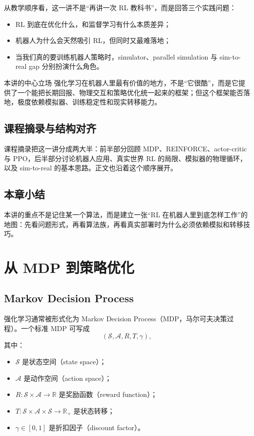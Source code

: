 \documentclass[a4paper]{article}
\begin{document}
从教学顺序看，这一讲不是“再讲一次 RL 教科书”，而是回答三个实践问题：
\begin{itemize}
  \item RL 到底在优化什么，和监督学习有什么本质差异；
  \item 机器人为什么会天然吸引 RL，但同时又最难落地；
  \item 当我们真的要训练机器人策略时，simulator、parallel simulation 与 sim-to-real gap 分别扮演什么角色。
\end{itemize}

\begin{importantbox}{本讲的中心立场}
强化学习在机器人里最有价值的地方，不是“它很酷”，而是它提供了一个能把长期回报、物理交互和策略优化统一起来的框架；但这个框架能否落地，极度依赖模拟器、训练稳定性和现实转移能力。
\end{importantbox}

\subsection{课程摘录与结构对齐}

课程摘录把这一讲分成两大半：前半部分回顾 MDP、REINFORCE、actor-critic 与 PPO，后半部分讨论机器人应用、真实世界 RL 的局限、模拟器的物理循环，以及 sim-to-real 的基本思路。正文也沿着这个顺序展开。

\subsection{本章小结}

本讲的重点不是记住某一个算法，而是建立一张“RL 在机器人里到底怎样工作”的地图：先看问题形式，再看算法族，再看真实部署时为什么必须依赖模拟和转移技巧。

\section{从 MDP 到策略优化}

\subsection{Markov Decision Process}

强化学习通常被形式化为 Markov Decision Process（MDP，马尔可夫决策过程）。一个标准 MDP 可写成
\[
(\mathcal{S}, \mathcal{A}, R, T, \gamma),
\]
其中：
\begin{itemize}
  \item \(\mathcal{S}\) 是状态空间（state space）；
  \item \(\mathcal{A}\) 是动作空间（action space）；
  \item \(R : \mathcal{S}\times\mathcal{A}\rightarrow \mathbb{R}\) 是奖励函数（reward function）；
  \item \(T : \mathcal{S}\times\mathcal{A}\times\mathcal{S}\rightarrow \mathbb{R}_+\) 是状态转移；
  \item \(\gamma\in[0,1]\) 是折扣因子（discount factor）。
\end{itemize}
\end{document}
